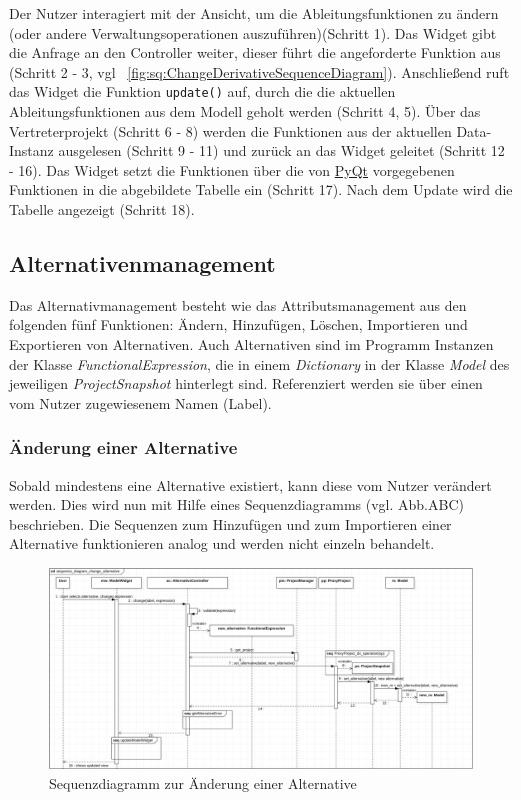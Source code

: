 \documentclass{article}
\begin{document}
Der Nutzer interagiert mit der Ansicht, um die Ableitungsfunktionen zu ändern (oder andere Verwaltungsoperationen auszuführen)(Schritt 1). Das Widget gibt die Anfrage an den Controller weiter, dieser führt die angeforderte Funktion aus (Schritt 2 - 3, vgl ~\ref{fig:sq:ChangeDerivativeSequenceDiagram}). Anschließend ruft das Widget die Funktion \texttt{update()} auf, durch die die aktuellen Ableitungsfunktionen aus dem Modell geholt werden (Schritt 4, 5). Über das Vertreterprojekt (Schritt 6 - 8) werden die Funktionen aus der aktuellen Data-Instanz ausgelesen (Schritt 9 - 11) und zurück an das Widget geleitet (Schritt 12 - 16). Das Widget setzt die Funktionen über die von \href{https://doc.qt.io/qt-6/qwidget.html}{PyQt} vorgegebenen Funktionen in die abgebildete Tabelle ein (Schritt 17). Nach dem Update wird die Tabelle angezeigt (Schritt 18).


\newpage
\subsection{Alternativenmanagement}\label{sec:Alternativenmanagement}
Das Alternativmanagement besteht wie das Attributsmanagement aus den folgenden fünf Funktionen: Ändern, Hinzufügen, Löschen, Importieren und Exportieren von Alternativen. Auch Alternativen sind im Programm Instanzen der Klasse \textit{FunctionalExpression}, die in einem \textit{Dictionary} in der Klasse \textit{Model} des jeweiligen \textit{ProjectSnapshot} hinterlegt sind. Referenziert werden sie über einen vom Nutzer zugewiesenem Namen (Label).
\subsubsection{Änderung einer Alternative}
Sobald mindestens eine Alternative existiert, kann diese vom Nutzer verändert werden. Dies wird nun mit Hilfe eines Sequenzdiagramms (vgl. Abb.ABC) beschrieben. Die Sequenzen zum Hinzufügen und zum Importieren einer Alternative funktionieren analog und werden nicht einzeln behandelt.
\begin{figure}[H]%
    \centering
    \includegraphics[width=12cm]{entwurf/Entwurf_dokument/img/Kevin/ChangeAlternative.png}
    \caption{Sequenzdiagramm zur Änderung einer Alternative}
    \label{fig:sq:ChangeAlternative}
\end{figure}
\end{document}
